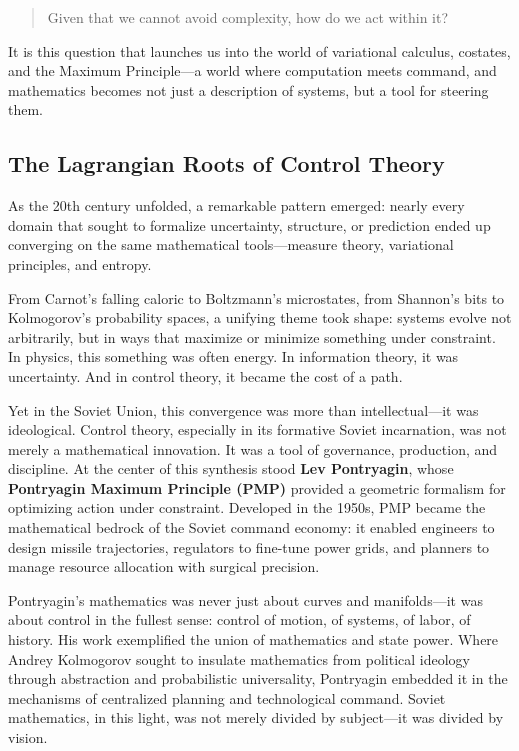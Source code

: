 \begin{quote}
Given that we cannot avoid complexity, how do we act within it?
\end{quote}

It is this question that launches us into the world of variational calculus, costates, and the Maximum Principle—a world where computation meets command, and mathematics becomes not just a description of systems, but a tool for steering them.

\subsection{The Lagrangian Roots of Control Theory}

As the 20th century unfolded, a remarkable pattern emerged: nearly every domain that sought to formalize uncertainty, structure, or prediction ended up converging on the same mathematical tools—measure theory, variational principles, and entropy.

From Carnot’s falling caloric to Boltzmann’s microstates, from Shannon’s bits to Kolmogorov’s probability spaces, a unifying theme took shape: systems evolve not arbitrarily, but in ways that maximize or minimize something under constraint. In physics, this something was often energy. In information theory, it was uncertainty. And in control theory, it became the cost of a path.

Yet in the Soviet Union, this convergence was more than intellectual—it was ideological. Control theory, especially in its formative Soviet incarnation, was not merely a mathematical innovation. It was a tool of governance, production, and discipline. At the center of this synthesis stood \textbf{Lev Pontryagin}, whose \textbf{Pontryagin Maximum Principle (PMP)} provided a geometric formalism for optimizing action under constraint. Developed in the 1950s, PMP became the mathematical bedrock of the Soviet command economy: it enabled engineers to design missile trajectories, regulators to fine-tune power grids, and planners to manage resource allocation with surgical precision.

Pontryagin’s mathematics was never just about curves and manifolds—it was about control in the fullest sense: control of motion, of systems, of labor, of history. His work exemplified the union of mathematics and state power. Where Andrey Kolmogorov sought to insulate mathematics from political ideology through abstraction and probabilistic universality, Pontryagin embedded it in the mechanisms of centralized planning and technological command. Soviet mathematics, in this light, was not merely divided by subject—it was divided by vision.

